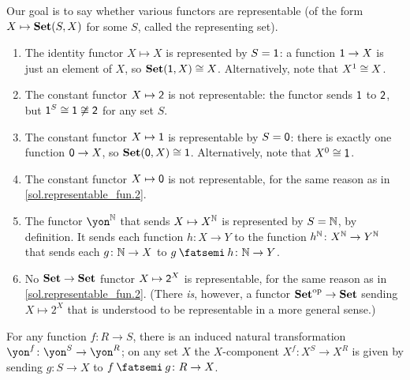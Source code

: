 \documentclass[Book-Poly]{subfiles}
\begin{document}
\begin{exercise}
\begin{solution}
Our goal is to say whether various functors are representable (of the form $X\mapsto\mathbf{Set}(S,X)$ for some $S$, called the representing set).
\begin{enumerate}
	\item The identity functor $X\mapsto X$ is represented by $S=\textsf{1}$: a function $\textsf{1} \to X$ is just an element of $X$, so $\mathbf{Set}(\textsf{1},X) \cong X$.
	Alternatively, note that $X^1 \cong X$.
	\item \label{sol.representable_fun.2} The constant functor $X\mapsto\textsf{2}$ is not representable: the functor sends $\textsf{1}$ to $\textsf{2}$, but $\textsf{1}^S \cong \textsf{1} \not\cong \textsf{2}$ for any set $S$.
	\item The constant functor $X\mapsto\textsf{1}$ is representable by $S=\textsf{0}$: there is exactly one function $\textsf{0} \to X$, so $\mathbf{Set}(\textsf{0},X) \cong \textsf{1}$.
	Alternatively, note that $X^0 \cong \textsf{1}$.
	\item The constant functor $X\mapsto\textsf{0}$ is not representable, for the same reason as in \cref{sol.representable_fun.2}.
	\item The functor $\yon^\nn$ that sends $X\mapsto X^{\mathbb{N}}$ is represented by $S=\mathbb{N}$, by definition.
	It sends each function $h \colon X \to Y$ to the function $h^{\mathbb{N}} \colon X^{\mathbb{N}} \to Y^{\mathbb{N}}$ that sends each $g \colon \mathbb{N} \to X$ to $g \then h \colon \nn \to Y$.
	\item No $\mathbf{Set} \to \mathbf{Set}$ functor $X\mapsto \textsf{2}^X$ is representable, for the same reason as in \cref{sol.representable_fun.2}.
	(There \emph{is}, however, a functor $\mathbf{Set}^{\textnormal{op}} \to \mathbf{Set}$ sending $X \mapsto 2^X$ that is understood to be representable in a more general sense.)
\end{enumerate}
\end{solution}
\end{exercise}

\begin{proposition}\label{prop.representable_nt}
For any function $f\colon R\to S$, there is an induced natural transformation $\yon^f\colon\yon^S\to \yon^R$; on any set $X$ the $X$-component $X^f\colon X^S\to X^R$ is given by sending $g\colon S\to X$ to $f\then g\colon R\to X$.
\end{proposition}
\end{document}
